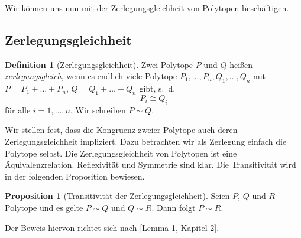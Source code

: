 \documentclass[11pt,titlepage]{article}
\theoremstyle{definition}
\newtheorem{proposition}[theorem]{Proposition}
\newtheorem{definition}[theorem]{Definition}
\theoremstyle{remark}
\begin{document}
	Wir können uns nun mit der Zerlegungsgleichheit von Polytopen beschäftigen.
	
	\subsection{Zerlegungsgleichheit}
	
	\begin{definition}[Zerlegungsgleichheit]
		Zwei Polytope $P$ und $Q$ heißen \textsl{zerlegungsgleich}, wenn es endlich viele Polytope 
		$P_1,\ldots,P_n,Q_1,\ldots,Q_n$ mit $P=P_1 +\ldots +P_n$,  $Q=Q_1 +\ldots+Q_n$ 
		gibt, s.~d. 
		\[P_i\cong Q_i\]
		für alle $i=1,\ldots,n$. Wir schreiben $P\sim Q$.
	\end{definition}
	
	Wir stellen fest, dass die Kongruenz zweier Polytope auch deren 
	Zerlegungsgleichheit impliziert. Dazu betrachten wir als Zerlegung einfach 
	die Polytope selbst. Die Zerlegungsgleichheit von Polytopen ist eine 
	Äquivalenzrelation. Reflexivität und Symmetrie sind klar. Die Transitivität 
	wird in der folgenden Proposition bewiesen.
	
	\begin{proposition}[Transitivität der Zerlegungsgleichheit] \label{lemma:transitiv}
		Seien $P$, $Q$ und $R$ Polytope und es gelte $P\sim Q$ und $Q\sim R$. Dann folgt $P\sim R$.
	\end{proposition}
	
	Der Beweis hiervon richtet sich nach \cite{Boltianskii}[Lemma 1, Kapitel 2].
	
\end{document}
